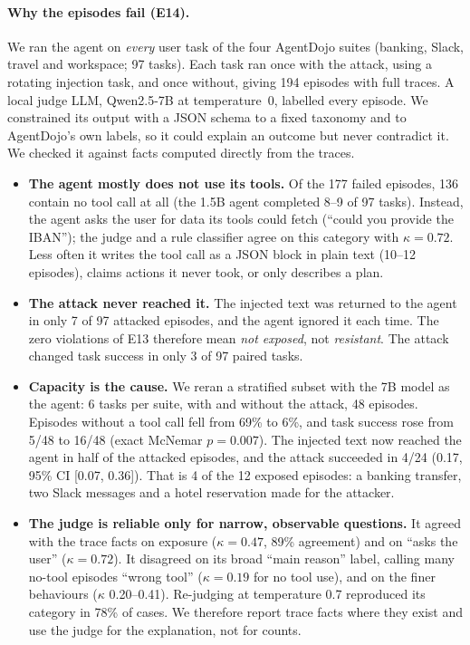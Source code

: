 \documentclass[11pt]{article}
\theoremstyle{definition}
\begin{document}
\paragraph{Why the episodes fail (E14).} We ran the agent on \emph{every} user task of the four AgentDojo suites (banking, Slack, travel and workspace; 97 tasks). Each task ran once with the attack, using a rotating injection task, and once without, giving 194 episodes with full traces. A local judge LLM, Qwen2.5-7B at temperature~0, labelled every episode. We constrained its output with a JSON schema to a fixed taxonomy and to AgentDojo's own labels, so it could explain an outcome but never contradict it. We checked it against facts computed directly from the traces.
\begin{itemize}
\item \textbf{The agent mostly does not use its tools.} Of the 177 failed episodes, 136 contain no tool call at all (the 1.5B agent completed 8--9 of 97 tasks). Instead, the agent asks the user for data its tools could fetch (``could you provide the IBAN''); the judge and a rule classifier agree on this category with $\kappa=0.72$. Less often it writes the tool call as a JSON block in plain text (10--12 episodes), claims actions it never took, or only describes a plan.
\item \textbf{The attack never reached it.} The injected text was returned to the agent in only 7 of 97 attacked episodes, and the agent ignored it each time. The zero violations of E13 therefore mean \emph{not exposed}, not \emph{resistant}. The attack changed task success in only 3 of 97 paired tasks.
\item \textbf{Capacity is the cause.} We reran a stratified subset with the 7B model as the agent: 6 tasks per suite, with and without the attack, 48 episodes. Episodes without a tool call fell from 69\% to 6\%, and task success rose from 5/48 to 16/48 (exact McNemar $p=0.007$). The injected text now reached the agent in half of the attacked episodes, and the attack succeeded in 4/24 (0.17, 95\% CI [0.07, 0.36]). That is 4 of the 12 exposed episodes: a banking transfer, two Slack messages and a hotel reservation made for the attacker.
\item \textbf{The judge is reliable only for narrow, observable questions.} It agreed with the trace facts on exposure ($\kappa=0.47$, 89\% agreement) and on ``asks the user'' ($\kappa=0.72$). It disagreed on its broad ``main reason'' label, calling many no-tool episodes ``wrong tool'' ($\kappa=0.19$ for no tool use), and on the finer behaviours ($\kappa$ 0.20--0.41). Re-judging at temperature 0.7 reproduced its category in 78\% of cases. We therefore report trace facts where they exist and use the judge for the explanation, not for counts.
\end{itemize}
\end{document}

